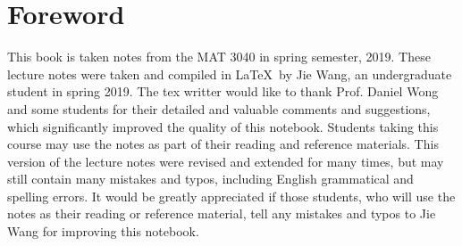 \chapter*{Foreword}


This book is taken notes from the MAT 3040 in spring semester, 2019. These lecture notes were taken and compiled in \LaTeX\ by Jie Wang, an undergraduate student in spring 2019. The tex writter would like to thank Prof. Daniel Wong and some students for their detailed and valuable comments and suggestions, which significantly improved the quality of this notebook. Students taking this course may use the notes as part of their reading and reference materials. This version of the lecture notes were revised and extended for many times, but may still contain many mistakes and typos, including English grammatical and spelling errors. It would be greatly appreciated if those students, who will use the notes as their reading or reference material, tell any mistakes and typos to Jie Wang for improving this notebook.
